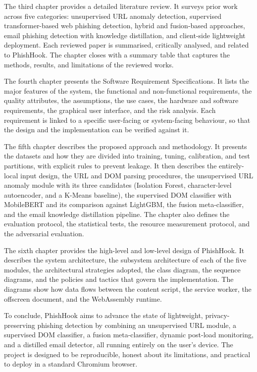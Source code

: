 \documentclass{FastFyp}
\begin{document}
The third chapter provides a detailed literature review. It surveys prior work across five categories: unsupervised URL anomaly detection, supervised transformer-based web phishing detection, hybrid and fusion-based approaches, email phishing detection with knowledge distillation, and client-side lightweight deployment. Each reviewed paper is summarised, critically analysed, and related to PhishHook. The chapter closes with a summary table that captures the methods, results, and limitations of the reviewed works.

The fourth chapter presents the Software Requirement Specifications. It lists the major features of the system, the functional and non-functional requirements, the quality attributes, the assumptions, the use cases, the hardware and software requirements, the graphical user interface, and the risk analysis. Each requirement is linked to a specific user-facing or system-facing behaviour, so that the design and the implementation can be verified against it.

The fifth chapter describes the proposed approach and methodology. It presents the datasets and how they are divided into training, tuning, calibration, and test partitions, with explicit rules to prevent leakage. It then describes the entirely-local input design, the URL and DOM parsing procedures, the unsupervised URL anomaly module with its three candidates (Isolation Forest, character-level autoencoder, and a K-Means baseline), the supervised DOM classifier with MobileBERT and its comparison against LightGBM, the fusion meta-classifier, and the email knowledge distillation pipeline. The chapter also defines the evaluation protocol, the statistical tests, the resource measurement protocol, and the adversarial evaluation.

The sixth chapter provides the high-level and low-level design of PhishHook. It describes the system architecture, the subsystem architecture of each of the five modules, the architectural strategies adopted, the class diagram, the sequence diagrams, and the policies and tactics that govern the implementation. The diagrams show how data flows between the content script, the service worker, the offscreen document, and the WebAssembly runtime.

To conclude, PhishHook aims to advance the state of lightweight, privacy-preserving phishing detection by combining an unsupervised URL module, a supervised DOM classifier, a fusion meta-classifier, dynamic post-load monitoring, and a distilled email detector, all running entirely on the user's device. The project is designed to be reproducible, honest about its limitations, and practical to deploy in a standard Chromium browser.
\pagebreak
\end{document}
